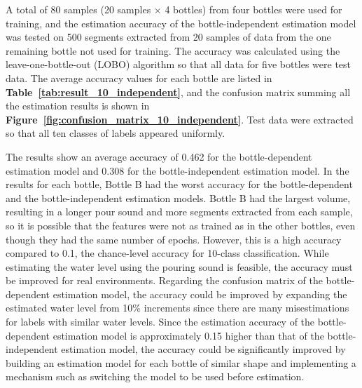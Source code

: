 \documentclass[sigconf,authordraft]{acmart}
\newcommand\figref[1]{\textbf{Figure~\ref{fig:#1}}}
\newcommand\tabref[1]{\textbf{Table~\ref{tab:#1}}}
\begin{document}
A total of 80 samples (20 samples $\times$ 4 bottles) from four bottles were used for training, and the estimation accuracy of the bottle-independent estimation model was tested on 500 segments extracted from 20 samples of data from the one remaining bottle not used for training. The accuracy was calculated using the leave-one-bottle-out (LOBO) algorithm so that all data for five bottles were test data. The average accuracy values for each bottle are listed in \tabref{result_10_independent}, and the confusion matrix summing all the estimation results is shown in \figref{confusion_matrix_10_independent}. Test data were extracted so that all ten classes of labels appeared uniformly.\par

The results show an average accuracy of 0.462 for the bottle-dependent estimation model and 0.308 for the bottle-independent estimation model. In the results for each bottle, Bottle B had the worst accuracy for the bottle-dependent and the bottle-independent estimation models. Bottle B had the largest volume, resulting in a longer pour sound and more segments extracted from each sample, so it is possible that the features were not as trained as in the other bottles, even though they had the same number of epochs. However, this is a high accuracy compared to 0.1, the chance-level accuracy for 10-class classification. While estimating the water level using the pouring sound is feasible, the accuracy must be improved for real environments. Regarding the confusion matrix of the bottle-dependent estimation model, the accuracy could be improved by expanding the estimated water level from 10\% increments since there are many misestimations for labels with similar water levels. Since the estimation accuracy of the bottle-dependent estimation model is approximately 0.15 higher than that of the bottle-independent estimation model, the accuracy could be significantly improved by building an estimation model for each bottle of similar shape and implementing a mechanism such as switching the model to be used before estimation.
\end{document}
